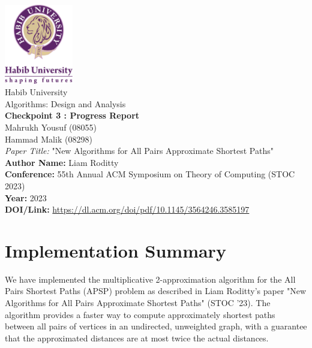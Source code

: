 \documentclass[a4paper,11pt,oneside]{book}
\begin{document}
\begin{titlepage}      
    \begin{center}
        \includegraphics[width=3cm]{figures/logo.png}\\[1.0cm]
        {\LARGE Habib University\\[0.5cm]
        Algorithms: Design and Analysis}\\[1cm]
        
        \linespread{0.1}\huge {
            \textbf{Checkpoint 3 : Progress Report} 
        }
        \linespread{1}~\\[2cm]
        {\Large 
            Mahrukh Yousuf (08055) \\ 
            Hammad Malik (08298)
        }\\[1cm] 
        
        {\large 
            \emph{Paper Title:} "New Algorithms for All Pairs Approximate Shortest Paths"}\\[1cm] 
            
        \large \textbf{Author Name:} Liam Roditty \\ 
        \textbf{Conference:} 55th Annual ACM Symposium on Theory of Computing (STOC 2023)\\
        \textbf{Year:} 2023\\
        \textbf{DOI/Link:} \url{https://dl.acm.org/doi/pdf/10.1145/3564246.3585197}
    \end{center}
\end{titlepage}

\setcounter{chapter}{0}

\part{Implementation Summary}

We have implemented the multiplicative 2-approximation algorithm for the All Pairs Shortest Paths (APSP) problem as described in Liam Roditty's paper "New Algorithms for All Pairs Approximate Shortest Paths" (STOC '23). The algorithm provides a faster way to compute approximately shortest paths between all pairs of vertices in an undirected, unweighted graph, with a guarantee that the approximated distances are at most twice the actual distances.
\end{document}
